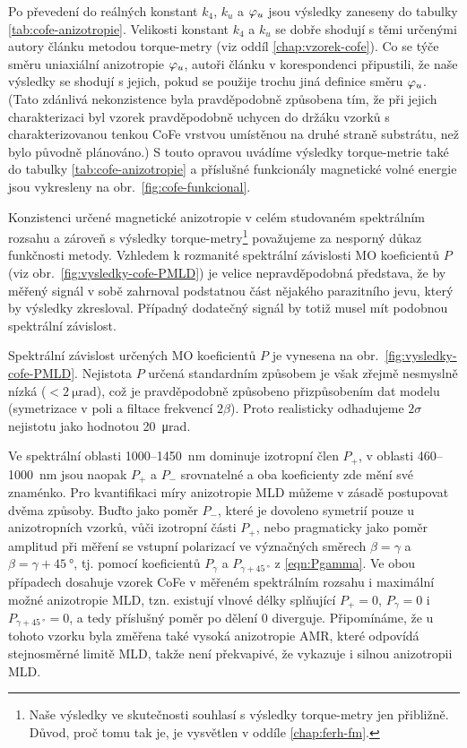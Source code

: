 Po převedení do reálných konstant $k_4$, $k_u$ a $\varphi_u$ jsou výsledky zaneseny do tabulky \ref{tab:cofe-anizotropie}.
Velikosti konstant $k_4$ a $k_u$ se dobře shodují s těmi určenými autory článku \cite{zengIntrinsicMechanismAnisotropic2020} metodou torque-metry (viz oddíl \ref{chap:vzorek-cofe}).
Co se týče směru uniaxiální anizotropie $\varphi_u$, autoři článku \cite{zengIntrinsicMechanismAnisotropic2020} v korespondenci \cite{wuUstniSdeleni} připustili, že naše výsledky se shodují s jejich, pokud se použije trochu jiná definice směru $\varphi_u$.
(Tato zdánlivá nekonzistence byla pravděpodobně způsobena tím, že při jejich charakterizaci byl vzorek pravděpodobně uchycen do držáku vzorků s charakterizovanou tenkou CoFe vrstvou umístěnou na druhé straně substrátu, než bylo původně plánováno.)
S touto opravou uvádíme výsledky torque-metrie také do tabulky \ref{tab:cofe-anizotropie} a příslušné funkcionály magnetické volné energie jsou vykresleny na obr.~\ref{fig:cofe-funkcional}.

Konzistenci určené magnetické anizotropie v celém studovaném spektrálním rozsahu a zároveň s výsledky torque-metry\footnote{Naše výsledky ve skutečnosti souhlasí s výsledky torque-metry jen přibližně. Důvod, proč tomu tak je, je vysvětlen v oddíle \ref{chap:ferh-fm}.} považujeme za nesporný důkaz funkčnosti metody.
Vzhledem k rozmanité spektrální závislosti MO koeficientů $P$ (viz obr.~\ref{fig:vysledky-cofe-PMLD}) je velice nepravděpodobná představa, že by měřený signál v sobě zahrnoval podstatnou část nějakého parazitního jevu, který by výsledky zkresloval.
Případný dodatečný signál by totiž musel mít podobnou spektrální závislost.

Spektrální závislost určených MO koeficientů $P$ je vynesena na obr.~\ref{fig:vysledky-cofe-PMLD}.
Nejistota $P$ určená standardním způsobem je však zřejmě nesmyslně nízká ($<\SI{2}{\micro\radian}$), což je pravděpodobně způsobeno přizpůsobením dat modelu (symetrizace v poli a filtace frekvencí $2\beta$).
Proto realisticky odhadujeme $2\sigma$ nejistotu jako hodnotou \SI{20}{\micro\radian}.

Ve spektrální oblasti \num{1000}--\SI{1450}{\nano\meter} dominuje izotropní člen $P_+$, v oblasti \num{460}--\SI{1000}{\nano\meter} jsou naopak $P_+$ a $P_-$ srovnatelné a oba koeficienty zde mění své znaménko.
Pro kvantifikaci míry anizotropie MLD můžeme v zásadě postupovat dvěma způsoby.
Buďto jako poměr $P_-$, které je dovoleno symetrií pouze u anizotropních vzorků, vůči izotropní části $P_+$, nebo pragmaticky jako poměr amplitud při měření se vstupní polarizací ve význačných směrech $\beta=\gamma$ a $\beta=\gamma+\SI{45}{\degree}$, tj. pomocí koeficientů $P_\gamma$ a $P_{\gamma+\SI{45}{\degree}}$ z \eqref{eqn:Pgamma}.
Ve obou případech dosahuje vzorek CoFe v měřeném spektrálním rozsahu i maximální možné anizotropie MLD, tzn. existují vlnové délky splňující $P_+=0$, $P_\gamma=0$ i $P_{\gamma+\SI{45}{\degree}}=0$, a tedy příslušný poměr po dělení $0$ diverguje.
Připomínáme, že u tohoto vzorku byla změřena\cite{zengIntrinsicMechanismAnisotropic2020} také vysoká anizotropie AMR, které odpovídá stejnosměrné limitě MLD, takže není překvapivé, že vykazuje i silnou anizotropii MLD.


